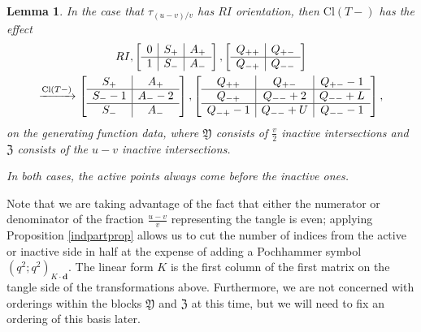 \documentclass[11pt]{amsart}
\theoremstyle{plain}
\newtheorem{lemmaN}[theoremN]{Lemma}
\theoremstyle{definition}
\theoremstyle{remark}
\begin{document}
\begin{lemmaN}
  In the case that $\tau_{(u-v)/v}$ has $RI$ orientation, then $\text{Cl}(T-)$ has the effect
\begin{multline*}
      RI, \left[\begin{array}{ c| c | c  }
    0 & S_+ & A_+  \\
    \hline
    1 & S_- & A_- 
  \end{array}\right],  
  \left[\begin{array}{ c |c }
    Q_{++} & Q_{+-} \\
    \hline
    Q_{-+} & Q_{--}
  \end{array}\right]
  \\
    \xrightarrow{\text{Cl}(T-)}
    \left[\begin{array}{ c | c  }
    S_+  & A_+  \\
    \hline
    S_- -1 & A_- -2 \\
    \hline
    S_-  & A_- 
  \end{array}\right], 
  \left[\begin{array}{ c | c | c}
    Q_{++} & Q_{+-} & Q_{+-}-1 \\
    \hline
    Q_{-+} & Q_{--}+2 & Q_{--}+L\\
    \hline
    Q_{-+}-1 & Q_{--}+U & Q_{--}-1
  \end{array}\right],
   \end{multline*}
on the generating function data, where $\mathfrak{Y}$ consists of $\frac{v}{2}$ inactive intersections and $\mathfrak{Z}$ consists of the $u-v$ inactive intersections. 

In both cases, the active points always come before the inactive ones.
\end{lemmaN}

Note that we are taking advantage of the fact that either the numerator or denominator of the fraction $\frac{u-v}{v}$ representing the tangle is even; applying Proposition \ref{indpartprop} allows us to cut the number of indices from the active or inactive side in half at the expense of adding a Pochhammer symbol $(q^2;q^2)_{K\cdot \textbf{d}}$. The linear form $K$ is the first column of the first matrix on the tangle side of the transformations above. Furthermore, we are not concerned with orderings within the blocks $\mathfrak{Y}$ and $\mathfrak{Z}$ at this time, but we will need to fix an ordering of this basis later.
\end{document}
